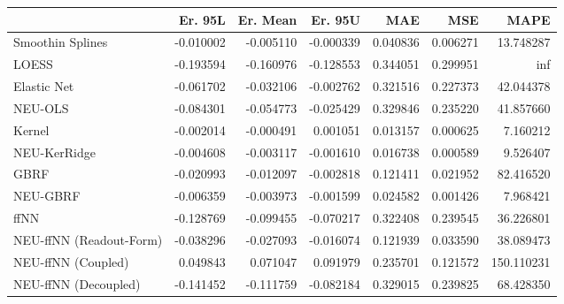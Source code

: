 \begin{tabular}{lrrrrrr}
\toprule
{} &   Er. 95L &  Er. Mean &   Er. 95U &       MAE &       MSE &        MAPE \\
\midrule
Smoothin Splines        & -0.010002 & -0.005110 & -0.000339 &  0.040836 &  0.006271 &   13.748287 \\
LOESS                   & -0.193594 & -0.160976 & -0.128553 &  0.344051 &  0.299951 &         inf \\
Elastic Net             & -0.061702 & -0.032106 & -0.002762 &  0.321516 &  0.227373 &   42.044378 \\
NEU-OLS                 & -0.084301 & -0.054773 & -0.025429 &  0.329846 &  0.235220 &   41.857660 \\
Kernel                  & -0.002014 & -0.000491 &  0.001051 &  0.013157 &  0.000625 &    7.160212 \\
NEU-KerRidge            & -0.004608 & -0.003117 & -0.001610 &  0.016738 &  0.000589 &    9.526407 \\
GBRF                    & -0.020993 & -0.012097 & -0.002818 &  0.121411 &  0.021952 &   82.416520 \\
NEU-GBRF                & -0.006359 & -0.003973 & -0.001599 &  0.024582 &  0.001426 &    7.968421 \\
ffNN                    & -0.128769 & -0.099455 & -0.070217 &  0.322408 &  0.239545 &   36.226801 \\
NEU-ffNN (Readout-Form) & -0.038296 & -0.027093 & -0.016074 &  0.121939 &  0.033590 &   38.089473 \\
NEU-ffNN (Coupled)      &  0.049843 &  0.071047 &  0.091979 &  0.235701 &  0.121572 &  150.110231 \\
NEU-ffNN (Decoupled)    & -0.141452 & -0.111759 & -0.082184 &  0.329015 &  0.239825 &   68.428350 \\
\bottomrule
\end{tabular}
